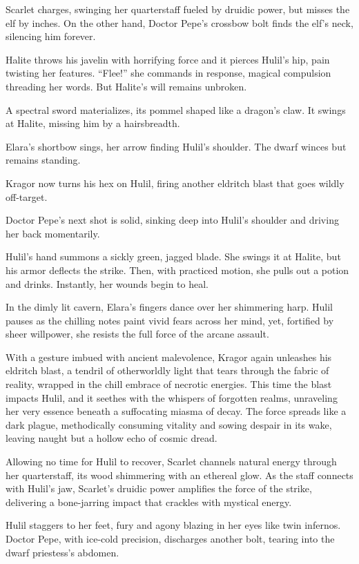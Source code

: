 \documentclass[
  letterpaper,12pt,twoside,twocolumn,openany,
  nodeprecatedcode,bg=full]{dndbook}
\begin{document}
Scarlet charges, swinging her quarterstaff fueled by druidic power, but
misses the elf by inches. On the other hand, Doctor Pepe's crossbow bolt
finds the elf's neck, silencing him forever.

Halite throws his javelin with horrifying force and it pierces Hulil's
hip, pain twisting her features. ``Flee!'' she commands in response,
magical compulsion threading her words. But Halite's will remains
unbroken.

A spectral sword materializes, its pommel shaped like a dragon's claw.
It swings at Halite, missing him by a hairsbreadth.

Elara's shortbow sings, her arrow finding Hulil's shoulder. The dwarf
winces but remains standing.

Kragor now turns his hex on Hulil, firing another eldritch blast that
goes wildly off-target.

Doctor Pepe's next shot is solid, sinking deep into Hulil's shoulder and
driving her back momentarily.

Hulil's hand summons a sickly green, jagged blade. She swings it at
Halite, but his armor deflects the strike. Then, with practiced motion,
she pulls out a potion and drinks. Instantly, her wounds begin to heal.

In the dimly lit cavern, Elara's fingers dance over her shimmering harp.
Hulil pauses as the chilling notes paint vivid fears across her mind,
yet, fortified by sheer willpower, she resists the full force of the
arcane assault.

With a gesture imbued with ancient malevolence, Kragor again unleashes
his eldritch blast, a tendril of otherworldly light that tears through
the fabric of reality, wrapped in the chill embrace of necrotic
energies. This time the blast impacts Hulil, and it seethes with the
whispers of forgotten realms, unraveling her very essence beneath a
suffocating miasma of decay. The force spreads like a dark plague,
methodically consuming vitality and sowing despair in its wake, leaving
naught but a hollow echo of cosmic dread.

Allowing no time for Hulil to recover, Scarlet channels natural energy
through her quarterstaff, its wood shimmering with an ethereal glow. As
the staff connects with Hulil's jaw, Scarlet's druidic power amplifies
the force of the strike, delivering a bone-jarring impact that crackles
with mystical energy.

Hulil staggers to her feet, fury and agony blazing in her eyes like twin
infernos. Doctor Pepe, with ice-cold precision, discharges another bolt,
tearing into the dwarf priestess's abdomen.
\end{document}

